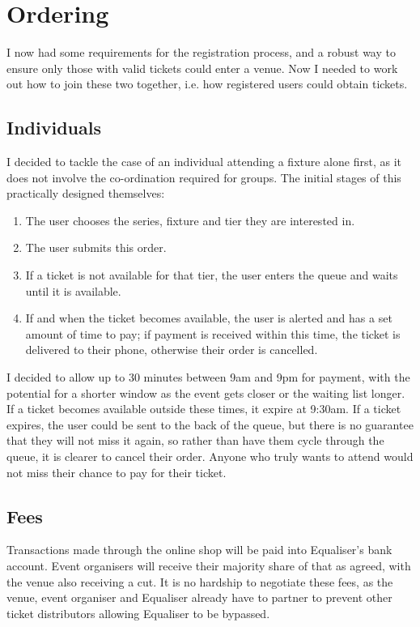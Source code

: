 \documentclass[12pt,a4]{bhamdissertation}
\begin{document}
\section{Ordering}

I now had some requirements for the registration process, and a robust way to ensure only those with valid tickets could enter a venue. Now I needed to work out how to join these two together, i.e. how registered users could obtain tickets.

\subsection{Individuals}

I decided to tackle the case of an individual attending a fixture alone first, as it does not involve the co-ordination required for groups. The initial stages of this practically designed themselves:

\begin{enumerate}
    \item The user chooses the series, fixture and tier they are interested in.
    \item The user submits this order.
    \item If a ticket is not available for that tier, the user enters the queue and waits until it is available.
    \item If and when the ticket becomes available, the user is alerted and has a set amount of time to pay; if payment is received within this time, the ticket is delivered to their phone, otherwise their order is cancelled.
\end{enumerate}

I decided to allow up to 30 minutes between 9am and 9pm for payment, with the potential for a shorter window as the event gets closer or the waiting list longer. If a ticket becomes available outside these times, it expire at 9:30am. If a ticket expires, the user could be sent to the back of the queue, but there is no guarantee that they will not miss it again, so rather than have them cycle through the queue, it is clearer to cancel their order. Anyone who truly wants to attend would not miss their chance to pay for their ticket.

\subsection{Fees}

Transactions made through the online shop will be paid into Equaliser's bank account. Event organisers will receive their majority share of that as agreed, with the venue also receiving a cut. It is no hardship to negotiate these fees, as the venue, event organiser and Equaliser already have to partner to prevent other ticket distributors allowing Equaliser to be bypassed.
\end{document}
